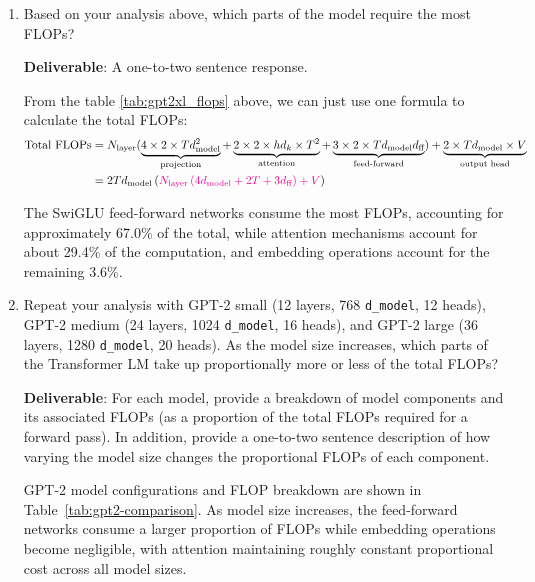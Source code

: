 \begin{enumerate}[label=(\alph*)]
    \item Based on your analysis above, which parts of the model require the most FLOPs?
    
    \textbf{Deliverable}: A one-to-two sentence response.
    
    \begin{answer}
    From the table \ref{tab:gpt2xl_flops} above, we can just use one formula to calculate the total FLOPs:
    \begin{equation*}
        \begin{aligned}
            \text{Total FLOPs} &= N_{\text{layer}} (
                \underbrace{4 \times 2 \times T d_{\text{model}}^2}_{\text{projection}} + 
                \underbrace{2 \times 2 \times h d_{k} \times T^2}_{\text{attention}} + 
                \underbrace{3 \times 2 \times T d_{\text{model}} d_{\text{ff}}}_{\text{feed-forward}}) + \underbrace{2 \times T d_{\text{model}} \times V}_{\text{output head}} \\
            &= 2 T d_{\text{model}} \left(
                {\color{magenta}N_{\text{layer}}  \left(
                    4 d_{\text{model}} + 2 T + 3 d_{\text{ff}}
                \right) + V}
            \right)
        \end{aligned}
    \end{equation*}

    The SwiGLU feed-forward networks consume the most FLOPs, accounting for approximately 67.0\% of the total, while attention mechanisms account for about 29.4\% of the computation, and embedding operations account for the remaining 3.6\%.
    \end{answer}
    
    \item Repeat your analysis with GPT-2 small (12 layers, 768 \lstinline{d_model}, 12 heads), GPT-2 medium (24 layers, 1024 \lstinline{d_model}, 16 heads), and GPT-2 large (36 layers, 1280 \lstinline{d_model}, 20 heads). As the model size increases, which parts of the Transformer LM take up proportionally more or less of the total FLOPs?
    
    \textbf{Deliverable}: For each model, provide a breakdown of model components and its associated FLOPs (as a proportion of the total FLOPs required for a forward pass). In addition, provide a one-to-two sentence description of how varying the model size changes the proportional FLOPs of each component.
    
    \begin{answer}
    GPT-2 model configurations and FLOP breakdown are shown in Table~\ref{tab:gpt2-comparison}. 
    As model size increases, the feed-forward networks consume a larger proportion of FLOPs while embedding operations become negligible, with attention maintaining roughly constant proportional cost across all model sizes.
    \end{answer}
    

\end{enumerate}
